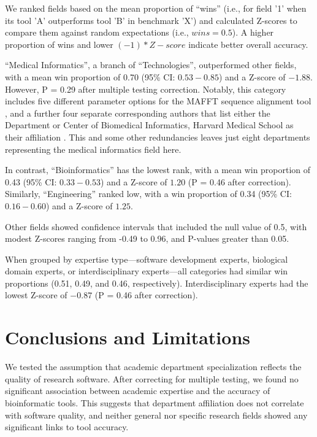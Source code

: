 \documentclass[fleqn,10pt,doc,onecolumn]{SelfArx}%
\begin{document}
We ranked fields based on the mean proportion of ``wins'' (i.e., for field '1' when its tool
'A' outperforms tool 'B' in benchmark 'X') and calculated Z-scores
to compare them against random expectations (i.e., $wins = 0.5$). A
higher proportion of wins and lower $(-1) * Z-score$ indicate better
overall accuracy.

``Medical Informatics'', a branch of ``Technologies'', outperformed
other fields, with a mean win proportion of 0.70 (95\% CI:
$0.53-0.85$) and a Z-score of $-1.88$. However, P = 0.29 after
multiple testing correction. Notably, this category includes five
different parameter options for the MAFFT sequence alignment tool
\cite{katoh2008recent}, and a further four separate corresponding
authors that list either the Department or Center of Biomedical
Informatics, Harvard Medical School as their affiliation
\cite{kim2010rsw,yang2013diverse,kharchenko2014bayesian,ruan2020fast}. This
and some other redundancies leaves just eight departments
representing the medical informatics field here.


In contrast, ``Bioinformatics'' has the lowest rank, with a mean win
proportion of 0.43 (95\% CI: $0.33-0.53$) and a Z-score of $1.20$ (P =
0.46 after correction). Similarly, ``Engineering'' ranked low, with a
win proportion of 0.34 (95\% CI: $0.16-0.60$) and a Z-score of $1.25$.

Other fields showed confidence intervals that included the null value
of 0.5, with modest Z-scores ranging from -0.49 to 0.96, and P-values
greater than 0.05.

When grouped by expertise type—software development experts,
biological domain experts, or interdisciplinary experts—all categories
had similar win proportions (0.51, 0.49, and 0.46,
respectively). Interdisciplinary experts had the lowest Z-score of
$-0.87$ (P = 0.46 after correction).



\section*{Conclusions and Limitations}

We tested the assumption that academic department specialization
reflects the quality of research software. After correcting for
multiple testing, we found no significant association between academic
expertise and the accuracy of bioinformatic tools. This suggests that
department affiliation does not correlate with software quality, and
neither general nor specific research fields showed any significant
links to tool accuracy.
\end{document}
